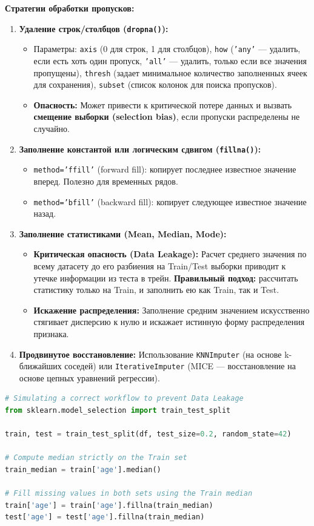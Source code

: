 \documentclass[12pt]{article}
\begin{document}
\textbf{Стратегии обработки пропусков:}
\begin{enumerate}
    \item \textbf{Удаление строк/столбцов (\texttt{dropna()}):}
    \begin{itemize}
        \item Параметры: \texttt{axis} (0 для строк, 1 для столбцов), \texttt{how} (\texttt{'any'} --- удалить, если есть хоть один пропуск, \texttt{'all'} --- удалить, только если все значения пропущены), \texttt{thresh} (задает минимальное количество заполненных ячеек для сохранения), \texttt{subset} (список колонок для поиска пропусков).
        \item \textbf{Опасность:} Может привести к критической потере данных и вызвать \textbf{смещение выборки (selection bias)}, если пропуски распределены не случайно.
    \end{itemize}
    \item \textbf{Заполнение константой или логическим сдвигом (\texttt{fillna()}):}
    \begin{itemize}
        \item \texttt{method='ffill'} (forward fill): копирует последнее известное значение вперед. Полезно для временных рядов.
        \item \texttt{method='bfill'} (backward fill): копирует следующее известное значение назад.
    \end{itemize}
    \item \textbf{Заполнение статистиками (Mean, Median, Mode):}
    \begin{itemize}
        \item \textbf{Критическая опасность (Data Leakage):} Расчет среднего значения по всему датасету до его разбиения на Train/Test выборки приводит к утечке информации из теста в трейн. \textbf{Правильный подход:} рассчитать статистику только на Train, и заполнить ею как Train, так и Test.
        \item \textbf{Искажение распределения:} Заполнение средним значением искусственно стягивает дисперсию к нулю и искажает истинную форму распределения признака.
    \end{itemize}
    \item \textbf{Продвинутое восстановление:} Использование \texttt{KNNImputer} (на основе k-ближайших соседей) или \texttt{IterativeImputer} (MICE --- восстановление на основе цепных уравнений регрессии).
\end{enumerate}

\begin{lstlisting}[language=Python, caption={Безопасное заполнение пропусков медианой}]
# Simulating a correct workflow to prevent Data Leakage
from sklearn.model_selection import train_test_split

train, test = train_test_split(df, test_size=0.2, random_state=42)

# Compute median strictly on the Train set
train_median = train['age'].median()

# Fill missing values in both sets using the Train median
train['age'] = train['age'].fillna(train_median)
test['age'] = test['age'].fillna(train_median)
\end{lstlisting}
\end{document}
